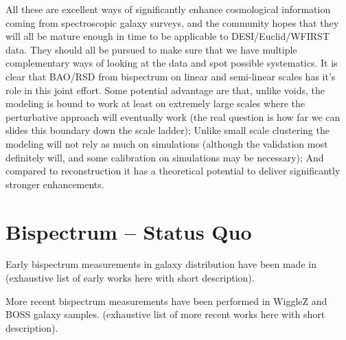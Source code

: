 All these are excellent ways of significantly enhance cosmological information
coming from spectroscopic galaxy surveys, and the community hopes that they
will all be mature enough in time to be applicable to DESI/Euclid/WFIRST data.
They should all be pursued to make sure that we have multiple complementary
ways of looking at the data and spot possible systematics. It is clear that
BAO/RSD from bispectrum on linear and semi-linear scales has it's role in this
joint effort. Some potential advantage are that, unlike voids, the modeling is
bound to work at least on extremely large scales where the perturbative
approach will eventually work (the real question is how far we can slides this
boundary down the scale ladder); Unlike small scale clustering the modeling
will not rely as much on simulations (although the validation most definitely
will, and some calibration on simulations may be necessary); And compared to
reconstruction it has a theoretical potential to deliver significantly stronger
enhancements.

\section{Bispectrum -- Status Quo}

Early bispectrum measurements in galaxy distribution have been made in
(exhaustive list of early works here with short description).

More recent bispectrum measurements have been performed in WiggleZ and BOSS
galaxy samples. (exhaustive list of more recent works here with short
description).

